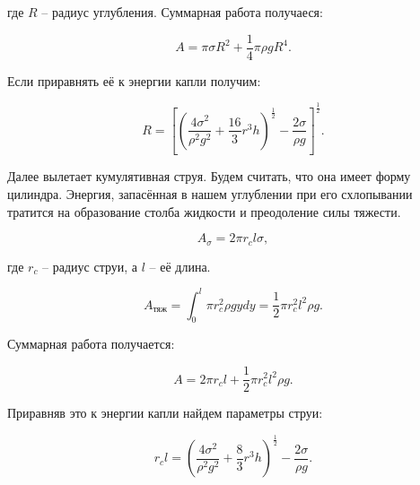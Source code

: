 \documentclass[a4paper, 12pt]{article}
\begin{document}
где $R$ -- радиус углубления.
Суммарная работа получаеся:

\begin{equation}
    A = \pi\sigma{R^2} + \frac{1}{4}\pi{\rho}gR^4.
\end{equation}

Если приравнять её к энергии капли получим:

\begin{equation}
    R = \left [\left (\frac{4\sigma^2}{\rho^2g^2} +
               \frac{16}{3}r^3h \right )^\frac{1}{2}
               - \frac{2\sigma}{\rho{g}} \right ] ^ \frac{1}{2}.
\end{equation}


Далее вылетает кумулятивная струя. Будем считать, что она имеет форму
цилиндра. Энергия, запасённая в нашем углублении при его схлопывании
тратится на образование столба жидкости и преодоление силы тяжести.

\begin{equation}
    A_\sigma = 2\pi{r_c}l\sigma,
\end{equation}

где $r_c$ -- радиус струи, а $l$ -- её длина.

\begin{equation}
    A_\text{тяж} = \int_{0}^{l} \pi{r_c^2}\rho{g}ydy =
                   \frac{1}{2}\pi{r_c^2}l^2\rho{g}.
\end{equation}

Суммарная работа получается:

\begin{equation}
    A = 2\pi{r_c}l + \frac{1}{2}\pi{r_c^2}l^2\rho{g}.
\end{equation}

Приравняв это к энергии капли найдем параметры струи:

\begin{equation}
    r_cl = \left (\frac{4\sigma^2}{\rho^2g^2} + \frac{8}{3}
                  r^3h \right ) ^ \frac{1}{2} - \frac{2\sigma}{\rho{g}}.
\end{equation}
\end{document}

